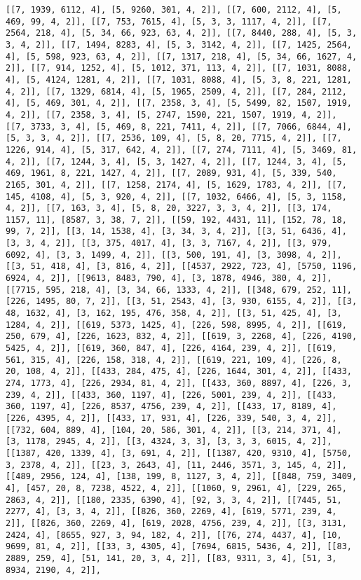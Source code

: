 \documentclass[12pt,fleqn]{article}\usepackage{../../common}
\begin{document}
\begin{verbatim}
[[7, 1939, 6112, 4], [5, 9260, 301, 4, 2]], [[7, 600, 2112, 4], [5, 469, 99, 4, 2]], [[7, 753, 7615, 4], [5, 3, 3, 1117, 4, 2]], [[7, 2564, 218, 4], [5, 34, 66, 923, 63, 4, 2]], [[7, 8440, 288, 4], [5, 3, 3, 4, 2]], [[7, 1494, 8283, 4], [5, 3, 3142, 4, 2]], [[7, 1425, 2564, 4], [5, 598, 923, 63, 4, 2]], [[7, 1317, 218, 4], [5, 34, 66, 1627, 4, 2]], [[7, 914, 1252, 4], [5, 1012, 371, 113, 4, 2]], [[7, 1031, 8088, 4], [5, 4124, 1281, 4, 2]], [[7, 1031, 8088, 4], [5, 3, 8, 221, 1281, 4, 2]], [[7, 1329, 6814, 4], [5, 1965, 2509, 4, 2]], [[7, 284, 2112, 4], [5, 469, 301, 4, 2]], [[7, 2358, 3, 4], [5, 5499, 82, 1507, 1919, 4, 2]], [[7, 2358, 3, 4], [5, 2747, 1590, 221, 1507, 1919, 4, 2]], [[7, 3733, 3, 4], [5, 469, 8, 221, 7411, 4, 2]], [[7, 7066, 6844, 4], [5, 3, 3, 4, 2]], [[7, 2536, 109, 4], [5, 8, 20, 7715, 4, 2]], [[7, 1226, 914, 4], [5, 317, 642, 4, 2]], [[7, 274, 7111, 4], [5, 3469, 81, 4, 2]], [[7, 1244, 3, 4], [5, 3, 1427, 4, 2]], [[7, 1244, 3, 4], [5, 469, 1961, 8, 221, 1427, 4, 2]], [[7, 2089, 931, 4], [5, 339, 540, 2165, 301, 4, 2]], [[7, 1258, 2174, 4], [5, 1629, 1783, 4, 2]], [[7, 145, 4108, 4], [5, 3, 920, 4, 2]], [[7, 1032, 6466, 4], [5, 3, 1158, 4, 2]], [[7, 163, 3, 4], [5, 8, 20, 3227, 3, 3, 4, 2]], [[3, 174, 1157, 11], [8587, 3, 38, 7, 2]], [[59, 192, 4431, 11], [152, 78, 18, 99, 7, 2]], [[3, 14, 1538, 4], [3, 34, 3, 4, 2]], [[3, 51, 6436, 4], [3, 3, 4, 2]], [[3, 375, 4017, 4], [3, 3, 7167, 4, 2]], [[3, 979, 6092, 4], [3, 3, 1499, 4, 2]], [[3, 500, 191, 4], [3, 3098, 4, 2]], [[3, 51, 418, 4], [3, 816, 4, 2]], [[4537, 2922, 723, 4], [5750, 1196, 6924, 4, 2]], [[9613, 8483, 790, 4], [3, 1878, 4946, 380, 4, 2]], [[7715, 595, 218, 4], [3, 34, 66, 1333, 4, 2]], [[348, 679, 252, 11], [226, 1495, 80, 7, 2]], [[3, 51, 2543, 4], [3, 930, 6155, 4, 2]], [[3, 48, 1632, 4], [3, 162, 195, 476, 358, 4, 2]], [[3, 51, 425, 4], [3, 1284, 4, 2]], [[619, 5373, 1425, 4], [226, 598, 8995, 4, 2]], [[619, 250, 679, 4], [226, 1623, 832, 4, 2]], [[619, 3, 2268, 4], [226, 4190, 5425, 4, 2]], [[619, 360, 847, 4], [226, 4164, 239, 4, 2]], [[619, 561, 315, 4], [226, 158, 318, 4, 2]], [[619, 221, 109, 4], [226, 8, 20, 108, 4, 2]], [[433, 284, 475, 4], [226, 1644, 301, 4, 2]], [[433, 274, 1773, 4], [226, 2934, 81, 4, 2]], [[433, 360, 8897, 4], [226, 3, 239, 4, 2]], [[433, 360, 1197, 4], [226, 5001, 239, 4, 2]], [[433, 360, 1197, 4], [226, 8537, 4756, 239, 4, 2]], [[433, 17, 8189, 4], [226, 4395, 4, 2]], [[433, 17, 931, 4], [226, 339, 540, 3, 4, 2]], [[732, 604, 889, 4], [104, 20, 586, 301, 4, 2]], [[3, 214, 371, 4], [3, 1178, 2945, 4, 2]], [[3, 4324, 3, 3], [3, 3, 3, 6015, 4, 2]], [[1387, 420, 1339, 4], [3, 691, 4, 2]], [[1387, 420, 9310, 4], [5750, 3, 2378, 4, 2]], [[23, 3, 2643, 4], [11, 2446, 3571, 3, 145, 4, 2]], [[489, 2956, 124, 4], [138, 199, 8, 1127, 3, 4, 2]], [[848, 759, 3409, 4], [457, 20, 8, 7238, 4522, 4, 2]], [[1060, 9, 2961, 4], [229, 265, 2863, 4, 2]], [[180, 2335, 6390, 4], [92, 3, 3, 4, 2]], [[7445, 51, 2277, 4], [3, 3, 4, 2]], [[826, 360, 2269, 4], [619, 5771, 239, 4, 2]], [[826, 360, 2269, 4], [619, 2028, 4756, 239, 4, 2]], [[3, 3131, 2424, 4], [8655, 927, 3, 94, 182, 4, 2]], [[76, 274, 4437, 4], [10, 9699, 81, 4, 2]], [[33, 3, 4305, 4], [7694, 6815, 5436, 4, 2]], [[83, 2889, 259, 4], [51, 141, 20, 3, 4, 2]], [[83, 9311, 3, 4], [51, 3, 8934, 2190, 4, 2]], 
\end{verbatim}
\end{document}
